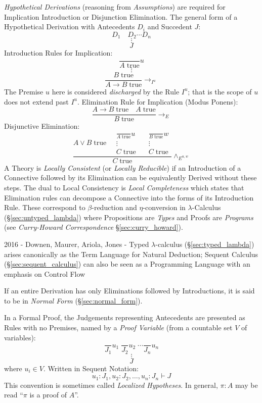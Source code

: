 \emph{Hypothetical Derivations} (reasoning from \emph{Assumptions})
are required for Implication Introduction or Disjunction
Elimination. The general form of a Hypothetical Derivation with
Antecedents $D_i$ and Succedent $J$:
\[
  D_1 \quad D_2 \cdots D_n
\]\[
  \vdots
\]\[
  J
\]
Introduction Rules for Implication:
\[
  {
    \frac{}
    {A\;\mathrm{true}}
  } u
\]\[
  \vdots
\]\[
  {
    \frac{B\;\mathrm{true}}
    {A \rightarrow B\;\mathrm{true}}
  } \rightarrow_{I^u}
\]
The Premise $u$ here is considered \emph{discharged} by the Rule
$I^u$; that is the scope of $u$ does not extend past $I^u$.
Elimination Rule for Implication (Modus Ponens):
\[
  {
    \frac{A \rightarrow B\;\mathrm{true} \quad A\;\mathrm{true}}
    {B\;\mathrm{true}}
  } \rightarrow_{E}
\]
Disjunctive Elimination:
\[
  \frac{
  A \vee B\;\mathrm{true} \quad
  \begin{matrix}
    {
      \frac{}
      {A\;\mathrm{true}}
    }u \\
    \vdots \\
    C\;\mathrm{true}
  \end{matrix}
  \quad
  \begin{matrix}
    {
      \frac{}
      {B\;\mathrm{true}}
    }w \\
    \vdots \\
    C\;\mathrm{true}
  \end{matrix}
  }{ C\;\mathrm{true}}\wedge_{E^{u,w}}
\]
A Theory is \emph{Locally Consistent} (or \emph{Locally Reducible}) if
an Introduction of a Connective followed by its Elimination can be
equivalently Derived without these steps. The dual to Local
Consistency is \emph{Local Completeness} which states that Elimination
rules can decompose a Connective into the forms of its Introduction
Rule. These correspond to $\beta$-reduction and $\eta$-conversion in
$\lambda$-Calculus (\S\ref{sec:untyped_lambda}) where Propositions
are \emph{Types} and Proofs are \emph{Programs} (see
\emph{Curry-Howard Correspondence} \S\ref{sec:curry_howard}).

2016 - Downen, Maurer, Ariola, Jones - Typed $\lambda$-calculus
(\S\ref{sec:typed_lambda}) arises canonically as the Term Language for Natural
Deduction; Sequent Calculus (\S\ref{sec:sequent_calculus}) can also be seen as a
Programming Language with an emphasis on Control Flow

If an entire Derivation has only Eliminations followed by
Introductions, it is said to be in \emph{Normal Form}
(\S\ref{sec:normal_form}).

In a Formal Proof, the Judgements representing Antecedents are
presented as Rules with no Premises, named by a \emph{Proof Variable}
(from a countable set $V$ of variables):
\[
  \frac{}{J_1}u_1 \; \frac{}{J_2}u_2 \; \cdots \frac{}{J_n}u_n
\]\[
  \vdots
\]\[
  J
\]
where $u_i \in V$. Written in Sequent Notation:
\[
  u_1:J_1, u_2:J_2, \ldots, u_n:J_n \vdash J
\]
This convention is sometimes called \emph{Localized Hypotheses}. In
general, $\pi : A$ may be read ``$\pi$ is a proof of $A$''.



